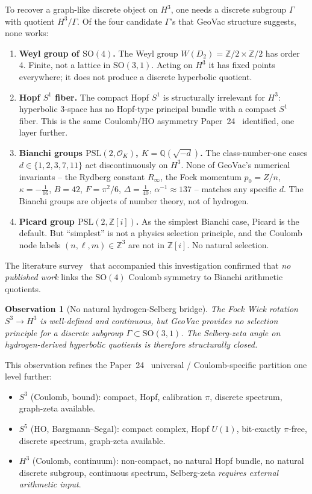 \documentclass[11pt]{article}
\newtheorem{observation}{Observation}
\begin{document}
To recover a graph-like discrete object on $H^3$, one needs a
discrete subgroup $\Gamma$ with quotient $H^3/\Gamma$.  Of the four
candidate $\Gamma$'s that GeoVac structure suggests, none works:

\begin{enumerate}
\item \textbf{Weyl group of $\mathrm{SO}(4)$.}  The Weyl group
$W(D_2)=\mathbb{Z}/2\times\mathbb{Z}/2$ has order 4.  Finite, not a
lattice in $\mathrm{SO}(3,1)$.  Acting on $H^3$ it has fixed points
everywhere; it does not produce a discrete hyperbolic quotient.
\item \textbf{Hopf $S^1$ fiber.}  The compact Hopf $S^1$ is
structurally irrelevant for $H^3$: hyperbolic 3-space has no Hopf-type
principal bundle with a compact $S^1$ fiber.  This is the same
Coulomb/HO asymmetry Paper~24~\cite{paper24} identified, one layer
further.
\item \textbf{Bianchi groups $\mathrm{PSL}(2,\mathcal{O}_K)$,
$K=\mathbb{Q}(\sqrt{-d})$.}  The class-number-one cases
$d\in\{1,2,3,7,11\}$ act discontinuously on $H^3$.  None of GeoVac's
numerical invariants -- the Rydberg constant $R_\infty$, the Fock
momentum $p_0=Z/n$, $\kappa=-\tfrac{1}{16}$, $B=42$, $F=\pi^2/6$,
$\Delta=\tfrac{1}{40}$, $\alpha^{-1}\approx 137$ -- matches any
specific $d$.  The Bianchi groups are objects of number theory, not
of hydrogen.
\item \textbf{Picard group $\mathrm{PSL}(2,\mathbb{Z}[i])$.}  As the
simplest Bianchi case, Picard is the default.  But ``simplest'' is
not a physics selection principle, and the Coulomb node labels
$(n,\ell,m)\in\mathbb{Z}^3$ are not in $\mathbb{Z}[i]$.  No natural
selection.
\end{enumerate}

The literature survey~\cite{rh_survey} that accompanied this
investigation confirmed that \emph{no published work} links the
$\mathrm{SO}(4)$ Coulomb symmetry to Bianchi arithmetic quotients.

\begin{observation}[No natural hydrogen-Selberg bridge]
\label{obs:no_selberg}
The Fock Wick rotation $S^3\to H^3$ is well-defined and continuous,
but GeoVac provides no selection principle for a discrete subgroup
$\Gamma\subset\mathrm{SO}(3,1)$.  The Selberg-zeta angle on
hydrogen-derived hyperbolic quotients is therefore structurally
closed.
\end{observation}

This observation refines the Paper~24~\cite{paper24} universal /
Coulomb-specific partition one level further:
\begin{itemize}
\item $S^3$ (Coulomb, bound): compact, Hopf, calibration $\pi$, discrete
spectrum, graph-zeta available.
\item $S^5$ (HO, Bargmann--Segal): compact complex, Hopf $U(1)$,
bit-exactly $\pi$-free, discrete spectrum, graph-zeta available.
\item $H^3$ (Coulomb, continuum): non-compact, no natural Hopf
bundle, no natural discrete subgroup, continuous spectrum,
Selberg-zeta \emph{requires external arithmetic input}.
\end{itemize}
\end{document}
